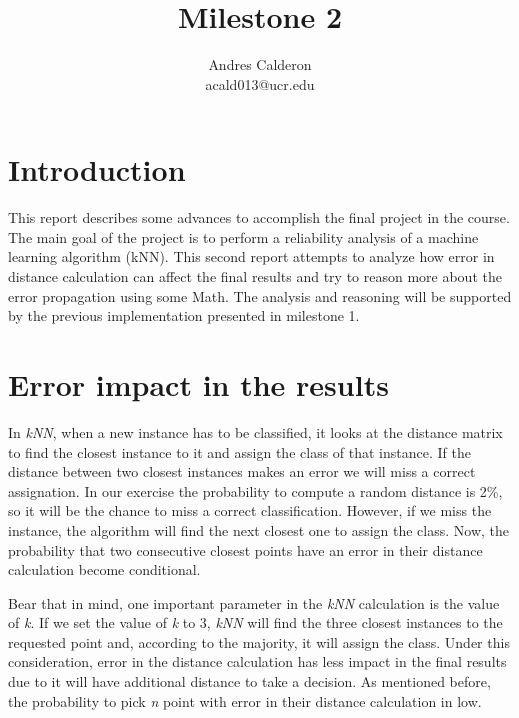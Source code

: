 \documentclass{article}\usepackage[]{graphicx}\usepackage[]{color}
\title{Milestone 2}
\author{Andres Calderon \\ acald013@ucr.edu}
\begin{document}
\maketitle

\section{Introduction}
This report describes some advances to accomplish the final project in the course. The main goal of the project is to perform a reliability analysis of a machine learning algorithm (kNN).  This second report attempts to analyze how error in distance calculation can affect the final results and try to reason more about the error propagation using some Math.  The analysis and reasoning will be supported by the previous implementation presented in milestone 1.

\section{Error impact in the results}
In \textit{kNN}, when a new instance has to be classified, it looks at the distance matrix to find the closest instance to it and assign the class of that instance.  If the distance between two closest instances makes an error we will miss a correct assignation. In our exercise the probability to compute a random distance is 2\%, so it will be the chance to miss a correct classification.  However, if we miss the instance, the algorithm will find the next closest one to assign the class. Now, the probability that two consecutive closest points have an error in their distance calculation become conditional. 

Bear that in mind, one important parameter in the \textit{kNN} calculation is the value of \textit{k}.  If we set the value of \textit{k} to 3, \textit{kNN} will find the three closest instances to the requested point and, according to the majority, it will assign the class. Under this consideration, error in the distance calculation has less impact in the final results due to it will have additional distance to take a decision.  As mentioned before, the probability to pick \textit{n} point with error in their distance calculation in low.
\end{document}
